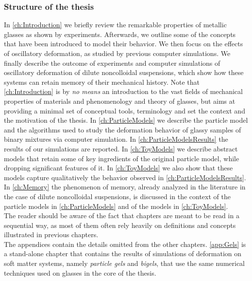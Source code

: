 \subsubsection*{Structure of the thesis}

In \autoref{ch:Introduction} we briefly review the remarkable properties of metallic glasses as shown by experiments. Afterwards, we outline some of the concepts that have been introduced to model their behavior. We then focus on the effects of oscillatory deformation, as studied by previous computer simulations. We finally describe the outcome of experiments and computer simulations of oscillatory deformation of dilute noncolloidal suspensions, which show how these systems can retain memory of their mechanical history. Note that \autoref{ch:Introduction} is by \emph{no means} an introduction to the vast fields of mechanical properties of materials and phenomenology and theory of glasses, but aims at providing a minimal set of conceptual tools, terminology and set the context and the motivation of the thesis. 
In \autoref{ch:ParticleModels} we describe the particle model and the algorithms used to study the deformation behavior of glassy samples of binary mixtures via computer simulation. In \autoref{ch:ParticleModelsResults} the results of our simulations are reported.
In \autoref{ch:ToyModels} we describe abstract models that retain some of key ingredients of the original particle model, while dropping significant features of it. In \autoref{ch:ToyModels} we also show that these models capture qualitatively the behavior observed in \autoref{ch:ParticleModelsResults}.\\
In \autoref{ch:Memory} the phenomenon of memory, already analyzed in the literature in the case of dilute noncolloidal suspensions, is discussed in the context of the particle models in \autoref{ch:ParticleModels} and of the models in \autoref{ch:ToyModels}. \\ 
The reader should be aware of the fact that chapters are meant to be read in a sequential way, as most of them often rely heavily on definitions and concepts illustrated in previous chapters. \\
The appendices contain the details omitted from the other chapters. \autoref{app:Gels} is a stand-alone chapter that contains the results of simulations of deformation on soft matter systems, namely \emph{particle gels} and \emph{bigels}, that use the same numerical techniques used on glasses in the core of the thesis.
	
